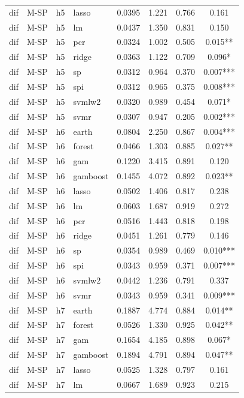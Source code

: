 \begin{ThreePartTable}
\begin{longtable}[t]{llclcccc}
dif & M-SP & h5 & lasso & 0.0395 & 1.221 & 0.766 & 0.161\\
dif & M-SP & h5 & lm & 0.0437 & 1.350 & 0.831 & 0.150\\
dif & M-SP & h5 & pcr & 0.0324 & 1.002 & 0.505 & 0.015**\\
dif & M-SP & h5 & ridge & 0.0363 & 1.122 & 0.709 & 0.096*\\
dif & M-SP & h5 & sp & 0.0312 & 0.964 & 0.370 & 0.007***\\
dif & M-SP & h5 & spi & 0.0312 & 0.965 & 0.375 & 0.008***\\
dif & M-SP & h5 & svmlw2 & 0.0320 & 0.989 & 0.454 & 0.071*\\
dif & M-SP & h5 & svmr & 0.0307 & 0.947 & 0.205 & 0.002***\\
\addlinespace
dif & M-SP & h6 & earth & 0.0804 & 2.250 & 0.867 & 0.004***\\
dif & M-SP & h6 & forest & 0.0466 & 1.303 & 0.885 & 0.027**\\
dif & M-SP & h6 & gam & 0.1220 & 3.415 & 0.891 & 0.120\\
dif & M-SP & h6 & gamboost & 0.1455 & 4.072 & 0.892 & 0.023**\\
dif & M-SP & h6 & lasso & 0.0502 & 1.406 & 0.817 & 0.238\\
dif & M-SP & h6 & lm & 0.0603 & 1.687 & 0.919 & 0.272\\
dif & M-SP & h6 & pcr & 0.0516 & 1.443 & 0.818 & 0.198\\
dif & M-SP & h6 & ridge & 0.0451 & 1.261 & 0.779 & 0.146\\
dif & M-SP & h6 & sp & 0.0354 & 0.989 & 0.469 & 0.010***\\
dif & M-SP & h6 & spi & 0.0343 & 0.959 & 0.371 & 0.007***\\
dif & M-SP & h6 & svmlw2 & 0.0442 & 1.236 & 0.791 & 0.337\\
dif & M-SP & h6 & svmr & 0.0343 & 0.959 & 0.341 & 0.009***\\
\addlinespace
dif & M-SP & h7 & earth & 0.1887 & 4.774 & 0.884 & 0.014**\\
dif & M-SP & h7 & forest & 0.0526 & 1.330 & 0.925 & 0.042**\\
dif & M-SP & h7 & gam & 0.1654 & 4.185 & 0.898 & 0.067*\\
dif & M-SP & h7 & gamboost & 0.1894 & 4.791 & 0.894 & 0.047**\\
dif & M-SP & h7 & lasso & 0.0525 & 1.328 & 0.797 & 0.161\\
dif & M-SP & h7 & lm & 0.0667 & 1.689 & 0.923 & 0.215\\

\end{longtable}
\end{ThreePartTable}
